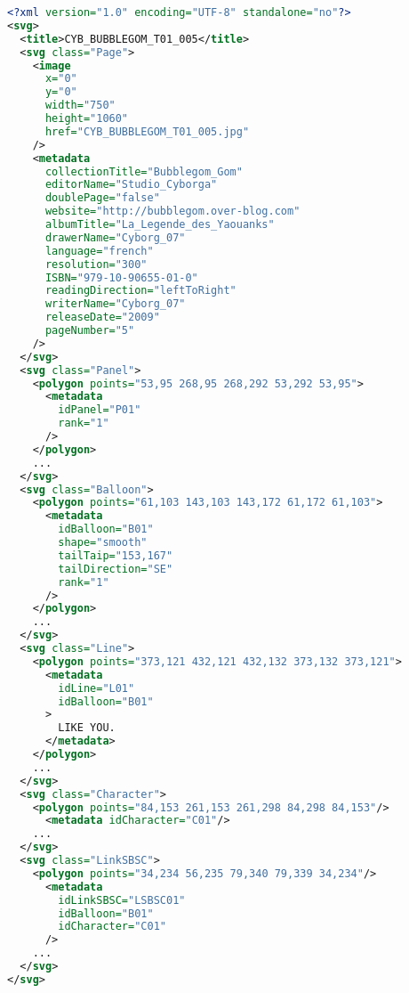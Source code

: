 \begin{lstlisting}[language=XML, frame=single, caption=Example of ground truth information stored in a SVG file, captionpos=b, label=list:svg_gt_sample]
<?xml version="1.0" encoding="UTF-8" standalone="no"?>
<svg>
  <title>CYB_BUBBLEGOM_T01_005</title>
  <svg class="Page">
    <image 
      x="0" 
      y="0" 
      width="750" 
      height="1060" 
      href="CYB_BUBBLEGOM_T01_005.jpg"
    />
    <metadata 
      collectionTitle="Bubblegom_Gom"
      editorName="Studio_Cyborga" 
      doublePage="false"
      website="http://bubblegom.over-blog.com"
      albumTitle="La_Legende_des_Yaouanks"
      drawerName="Cyborg_07"
      language="french"
      resolution="300"
      ISBN="979-10-90655-01-0"
      readingDirection="leftToRight" 
      writerName="Cyborg_07"
      releaseDate="2009"
      pageNumber="5"
    />
  </svg>
  <svg class="Panel">
    <polygon points="53,95 268,95 268,292 53,292 53,95">
      <metadata 
        idPanel="P01"
        rank="1"
      />
    </polygon>
    ...
  </svg>
  <svg class="Balloon">
    <polygon points="61,103 143,103 143,172 61,172 61,103">
      <metadata
        idBalloon="B01" 
        shape="smooth"
        tailTaip="153,167"
        tailDirection="SE" 
        rank="1"
      />
    </polygon>
    ...
  </svg>
  <svg class="Line">
    <polygon points="373,121 432,121 432,132 373,132 373,121">
      <metadata 
        idLine="L01"
        idBalloon="B01"
      >
        LIKE YOU.
      </metadata>
    </polygon>
    ...
  </svg>
  <svg class="Character">
    <polygon points="84,153 261,153 261,298 84,298 84,153"/>
      <metadata idCharacter="C01"/>
    ...
  </svg>
  <svg class="LinkSBSC">
    <polygon points="34,234 56,235 79,340 79,339 34,234"/>
      <metadata 
        idLinkSBSC="LSBSC01"
        idBalloon="B01"
        idCharacter="C01"
      />
    ...
  </svg>
</svg>
\end{lstlisting}
